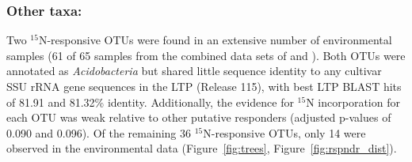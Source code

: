 \subsubsection{\textbf{Other taxa:}} Two $^{15}$N-responsive OTUs were found
in an extensive number of environmental samples (61 of 65 samples from the
combined data sets of \citet{Garcia_Pichel_2013} and \citet{Steven_2013}).
Both OTUs were annotated as \textit{Acidobacteria} but shared little sequence
identity to any cultivar SSU rRNA gene sequences in the LTP (Release 115),
with best LTP BLAST hits of 81.91 and 81.32\% identity. Additionally, the
evidence for $^{15}$N incorporation for each OTU was weak relative to other
putative responders (adjusted p-values of 0.090 and 0.096). Of the remaining
36 $^{15}$N-responsive OTUs, only 14 were observed in the environmental
data (Figure~\ref{fig:trees}, Figure~\ref{fig:rspndr_dist}).
%
%
